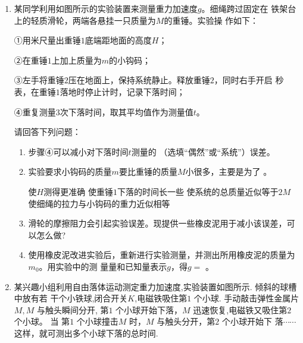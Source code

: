 \begin{enumerate}
\newpage
\item
{}
某同学利用如图所示的实验装置来测量重力加速度$ g $。细绳跨过固定在
铁架台上的轻质滑轮，两端各悬挂一只质量为$ M $的重锤。实验操 作如下：

①用米尺量出重锤$ 1 $底端距地面的高度$ H $；



②在重锤$ 1 $上加上质量为$ m $的小钩码；

③左手将重锤$ 2 $压在地面上，保持系统静止。释放重锤$ 2 $，同时右手开启
秒表，在重锤$ 1 $落地时停止计时，记录下落时间；

④重复测量$ 3 $次下落时间，取其平均值作为测量值$ t $。
\begin{figure}[h!]
\centering

\end{figure}



请回答下列问题：
\begin{enumerate}
\renewcommand{\labelenumi}{\arabic{enumi}.}
\item
步骤④可以减小对下落时间$ t $测量的
（选填“偶然”或“系统”）误差。

\item 
实验要求小钩码的质量$ m $要比重锤的质量$ M $小很多，主要是为了
。

\fourchoices
{使$ H $测得更准确}
{使重锤$ 1 $下落的时间长一些}
{使系统的总质量近似等于$ 2M $}
{使细绳的拉力与小钩码的重力近似相等}

\item 
滑轮的摩擦阻力会引起实验误差。现提供一些橡皮泥用于减小该误差，可以怎么做?


\item 
使用橡皮泥改进实验后，重新进行实验测量，并测出所用橡皮泥的质量为$ m_{0} $。用实验中的测
量量和已知量表示$ g $，得$ g= $  。


\end{enumerate}



\newpage
\item 
{}
某兴趣小组利用自由落体运动测定重力加速度,实验装置如图所示. 倾斜的球槽中放有若
干个小铁球,闭合开关$ K $,电磁铁吸住第$ 1 $ 个小球. 手动敲击弹性金属片$ M,M $ 与触头瞬间分开, 第$ 1 $
个小球开始下落，$ M $ 迅速恢复,电磁铁又吸住第$ 2 $ 个小球。 当
第$ 1 $ 个小球撞击$ M $ 时，$ M $ 与触头分开，第$ 2 $ 个小球开始下
落$ \cdots \cdots $ 这样，就可测出多个小球下落的总时间.
\begin{figure}[h!]
\centering

\end{figure}



\end{enumerate}
